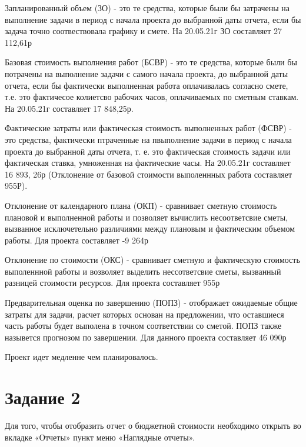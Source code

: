 Запланированный объем (ЗО) - это те средства, которые были бы затрачены на выполнение задачи в период с начала проекта до выбранной даты отчета, если бы задача точно соотвествовала графику и смете. На 20.05.21г ЗО составляет 27 112,61р


Базовая стоимость выполнения работ (БСВР) - это те средства, которые были бы потрачены на выполнение задачи с самого начала проекта, до выбранной даты отчета, если бы фактически выполненная работа оплачивалась согласно смете, т.е. это фактичесое колиетсво рабочих часов, оплачиваемых по сметным ставкам. На 20.05.21г составляет 17 848,25р.


Фактические затраты или фактическая стоимость выполненных работ (ФСВР) - это средства, фактически птраченные на пвыполнение задачи в период с начала проекта до выбранной даты отчета, т. е. это фактическая стоимость задачи или фактическая ставка, умноженная на фактические часы. На 20.05.21г составляет 16 893, 26р (Отклонение от базовой стоимости выполеннных работа составляет 955Р).


Отклонение от календарного плана (ОКП) - сравнивает сметную стоимость плановой и выполненной работы и позволяет вычислить несоответсвие сметы, вызванное исключетельно различиями между плановым и фактическим объемом работы. Для проекта составляет  -9 264р


Отклонение по стоимости (ОКС) - сравнивает сметную и фактическую стоимость выполеннной работы и возволяет выделить нессответсвие сметы, вызванный разницей стоимости ресурсов. Для проекта составляет 955р


Предварительная оценка по завершению (ПОПЗ) - отображает ожидаемые общие затраты для задачи, расчет которых основан на предложении, что оставшиеся часть работы будет выполена в точном соответствии со сметой. ПОПЗ также назывется прогнозом по завершении. Для данного проекта составляет 46 090р


Проект идет  медленне чем планировалось.

\section{Задание 2}
Для того, чтобы отобразить отчет о бюджетной стоимости необходимо открыть во вкладке «Отчеты» пункт меню «Наглядные отчеты».

